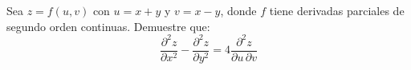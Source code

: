 Sea $z = f(u, v)$ con $u = x + y$ y $v = x - y$, donde $f$ tiene derivadas parciales de segundo orden continuas. Demuestre que:
\[
\frac{\partial^2 z}{\partial x^2} - \frac{\partial^2 z}{\partial y^2} = 4\frac{\partial^2 z}{\partial u \,\partial v}
\]
